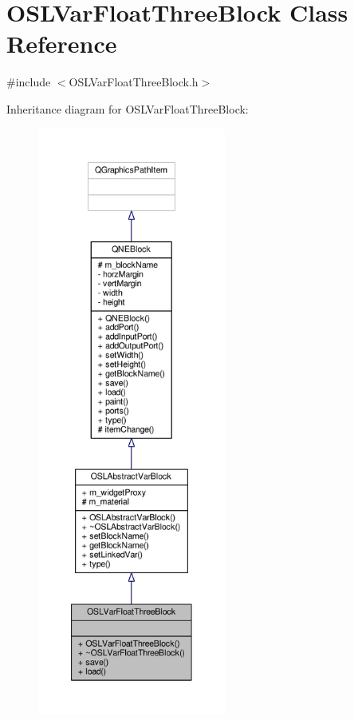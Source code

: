 \hypertarget{class_o_s_l_var_float_three_block}{\section{O\-S\-L\-Var\-Float\-Three\-Block Class Reference}
\label{class_o_s_l_var_float_three_block}
}


{\ttfamily \#include $<$O\-S\-L\-Var\-Float\-Three\-Block.\-h$>$}



Inheritance diagram for O\-S\-L\-Var\-Float\-Three\-Block\-:
\nopagebreak
\begin{figure}[H]
\begin{center}
\leavevmode
\includegraphics[height=550pt]{class_o_s_l_var_float_three_block__inherit__graph}
\end{center}
\end{figure}


